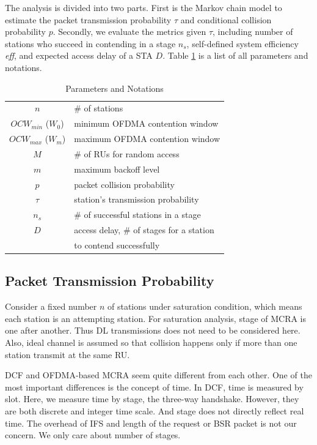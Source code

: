 \documentclass[journal]{IEEEtran}
\begin{document}
The analysis is divided into two parts. First is the Markov chain model to estimate the packet transmission probability $\tau$ and conditional collision probability $p$. 
Secondly, we evaluate the metrics given $\tau$, including number of stations who succeed in contending in a stage $n_s$, self-defined system efficiency \textit{eff}, and expected access delay of a STA $D$.  
Table \ref{table_notation} is a list of all parameters and notations.

\begin{table}[!h]
\caption{Parameters and Notations}
\centering
\label{table_notation}
\begin{tabular}{c|l}
\hline
$n$						& $\#$ of stations \\
$OCW_{min}$ ($W_0$)		& minimum OFDMA contention window \\
$OCW_{max}$ ($W_m$)		& maximum OFDMA contention window \\
$M$						& $\#$ of RUs for random access \\
$m$						& maximum backoff level \\
$p$						& packet collision probability \\
$\tau$					& station's transmission probability \\
$n_s$					& $\#$ of successful stations in a stage \\
$D$						& access delay, $\#$ of stages for a station\\
						& to contend successfully \\
\hline
\end{tabular}
\end{table}

\subsection{Packet Transmission Probability}
Consider a fixed number $n$ of stations under saturation condition, which means each station is an attempting station. 
For saturation analysis, stage of MCRA is one after another.
Thus DL transmissions does not need to be considered here.
Also, ideal channel is assumed so that collision happens only if more than one station transmit at the same RU.

DCF and OFDMA-based MCRA seem quite different from each other. 
One of the most important differences is the concept of time. In DCF, time is measured by slot. Here, we measure time by stage, the three-way handshake. 
However, they are both discrete and integer time scale. And stage does not directly reflect real time. 
The overhead of IFS and length of the request or BSR packet is not our concern. We only care about number of stages.
\end{document}
